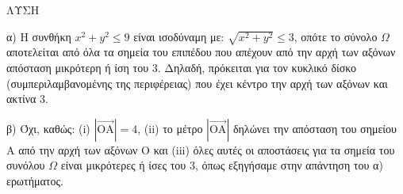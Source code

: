 ΛΥΣΗ

α) Η συνθήκη $x^2 + y^2 \le 9$ είναι ισοδύναμη με: $\sqrt{x^2 + y^2} \le 3$, οπότε το σύνολο $\Omega$ αποτελείται από όλα τα σημεία του επιπέδου που απέχουν από την αρχή των αξόνων απόσταση μικρότερη ή ίση του $3$. Δηλαδή, πρόκειται για τον κυκλικό δίσκο (συμπεριλαμβανομένης της περιφέρειας) που έχει κέντρο την αρχή των αξόνων και ακτίνα $3$.


β) Όχι, καθώς: (i) $\left|\overrightarrow{\text{OA}}\right| = 4$, (ii) το μέτρο $\left|\overrightarrow{\text{OA}}\right|$ δηλώνει την απόσταση του σημείου A από την αρχή των αξόνων O και (iii) όλες αυτές οι αποστάσεις για τα σημεία του συνόλου $\Omega$ είναι μικρότερες ή ίσες του $3$, όπως εξηγήσαμε στην απάντηση του α) ερωτήματος.